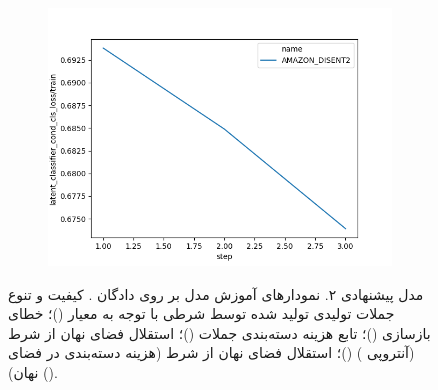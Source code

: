 \begin{figure}[h]
\begin{subfigure}{0.3\textheight}
        \includegraphics[width=1.\textwidth]{images/figs2/2020_01_15__11_44_04__latent_classifier_cond_cls_loss.png}
        \caption{}
        \label{fig:chap4:amazon_disent_latent_cls}
    \end{subfigure}
    \caption{
        مدل پیشنهادی ۲. نمودار‌های آموزش مدل بر روی دادگان \amazon{}.
        کیفیت و تنوع جملات تولیدی تولید شده توسط \decoder{} شرطی با توجه به معیار \jaccard{}
        ()؛
        خطای بازسازی
        ()؛
        تابع هزینه دسته‌بندی جملات
        ()؛
        استقلال فضای نهان از شرط (آنتروپی \classifier{})
        ()؛
        استقلال فضای نهان از شرط (هزینه دسته‌بندی \classifier{} در فضای نهان)
        ().
    }
    \label{fig:chap4:amazon_disent}
\end{figure}
